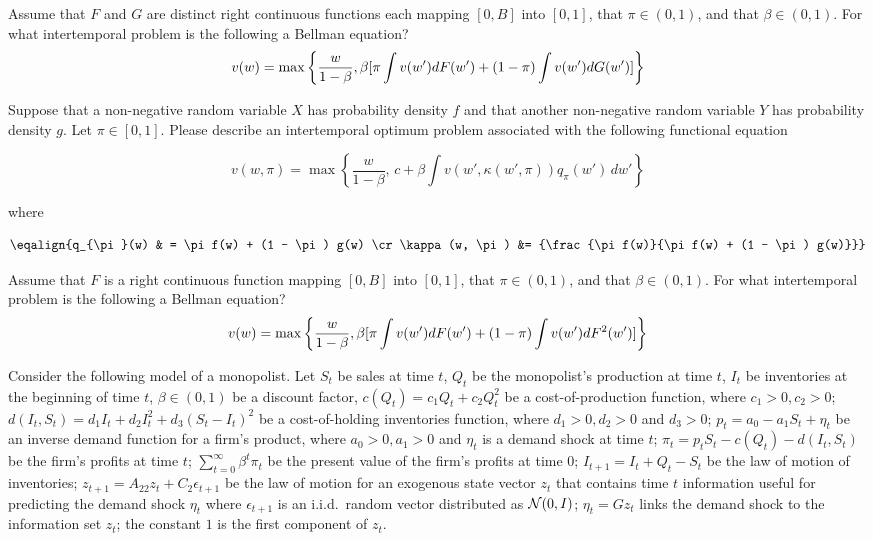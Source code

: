   Assume that  $F$ and $G$ are distinct  right continuous functions each mapping $[0, B]$ into $[0,1]$, that $\pi \in (0,1)$, and  that $\beta \in (0,1)$. For what intertemporal problem is the following a Bellman equation?
$$ v(w) = \max\left\{ {w\over{1-\beta}},  \beta [  \pi \int v(w') d F(w') + (1-\pi) \int v(w') d G(w') ]  \right\} $$





\medskip
{}
\noindent Suppose that a non-negative random variable $X$ has probability density $f$ and that another non-negative random variable $Y$  has probability density $g$.  Let $\pi \in [0,1]$.   Please describe an intertemporal optimum problem associated with the following functional equation


$$
v(w, \pi)
= \max \left\{
{\frac{w}{1 - \beta}}, \, c + \beta \int v(w', \kappa(w', \pi))  q_{\pi}(w') \, dw'
\right\}
$$
%

where

$$
\eqalign{q_{\pi}(w) & = \pi f(w) + (1 - \pi) g(w) \cr
\kappa(w, \pi)  &= {\frac{\pi f(w)}{\pi f(w) + (1 - \pi) g(w)}}}
$$


\bye

\medskip

  Assume that  $F$ is a   right continuous function mapping $[0, B]$ into $[0,1]$, that $\pi \in (0,1)$, and  that $\beta \in (0,1)$.
For what intertemporal problem is the following a Bellman equation?
$$ v(w) = \max\left\{ {w\over{1-\beta}},  \beta [  \pi \int v(w') d F(w') + (1-\pi) \int v(w') d F^2(w') ]  \right\} $$

\medskip



\medskip
{} Consider the following model of a monopolist.  Let  $S_t$ be sales at time $t$, $Q_t$ be the monopolist's production  at time $t$,
 $I_t$ be inventories at the beginning of time $t$,  $\beta \in (0,1)$ be a discount factor,  $c(Q_t) = c_1 Q_t + c_2 Q_t^2$ be a cost-of-production function, where $c_1>0, c_2>0$;
  $d(I_t, S_t) = d_1 I_t + d_2 I_t^2  + d_3 (S_t - I_t)^2$ be a cost-of-holding inventories function, where $d_1 >0, d_2 >0 $ and $d_3 >0$;
$p_t = a_0 - a_1 S_t + \eta_t $ be an inverse demand function for a firm's product, where $a_0>0, a_1 >0$ and $\eta_t$ is a demand shock at time  $t$;
   $\pi_t = p_t S_t - c(Q_t) - d(I_t, S_t) $ be the firm's profits at time $t$;
   $\sum_{t=0}^\infty \beta^t \pi_t $ be the present value of the firm's profits at time $0$;  $I_{t+1} = I_t + Q_t - S_t$ be the law of motion of inventories;
 $z_{t+1} = A_{22} z_t + C_2 \epsilon_{t+1} $ be the law of motion for an exogenous state vector $z_t$ that contains time $t$ information useful for predicting the demand shock $\eta_t$ where
 $\epsilon_{t+1}$ is an i.i.d.~random vector distributed as ${\cal N}(0,I)$;
   $\eta_t = G z_t $ links the demand shock to the information set $z_t$;
   the constant $1$ is the first component of $z_t$.

